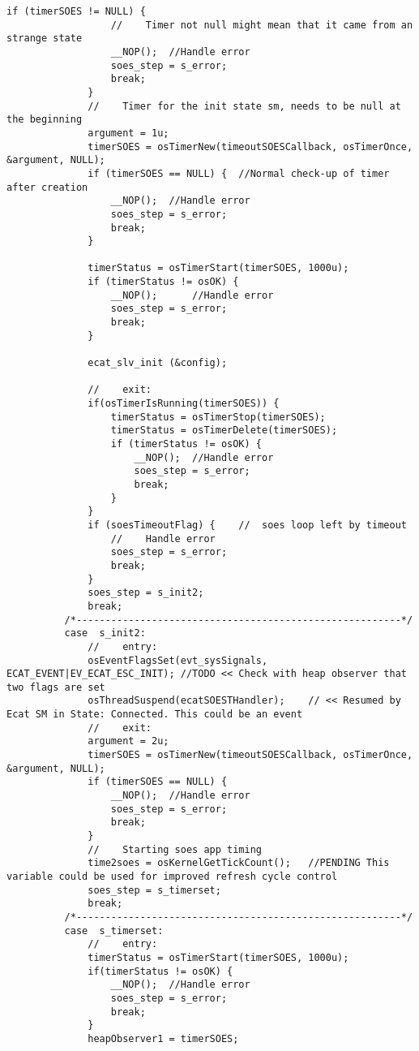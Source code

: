 \begin{lstlisting}[label=lst:soesAPP,caption={Main source code for SOES APP DSM.}]
              if (timerSOES != NULL) {
                  //	Timer not null might mean that it came from an strange state
                  __NOP();	//Handle error
                  soes_step = s_error;
                  break;
              }
              //	Timer for the init state sm, needs to be null at the beginning
              argument = 1u;
              timerSOES = osTimerNew(timeoutSOESCallback, osTimerOnce, &argument, NULL);
              if (timerSOES == NULL) {	//Normal check-up of timer after creation
                  __NOP();	//Handle error
                  soes_step = s_error;
                  break;
              }
   
              timerStatus = osTimerStart(timerSOES, 1000u);
              if (timerStatus != osOK) {
                  __NOP();		//Handle error
                  soes_step = s_error;
                  break;
              }
   
              ecat_slv_init (&config);
   
              //	exit:
              if(osTimerIsRunning(timerSOES)) {
                  timerStatus = osTimerStop(timerSOES);
                  timerStatus = osTimerDelete(timerSOES);
                  if (timerStatus != osOK) {
                      __NOP();	//Handle error
                      soes_step = s_error;
                      break;
                  }
              }
              if (soesTimeoutFlag) {	//	soes loop left by timeout
                  //	Handle error
                  soes_step = s_error;
                  break;
              }
              soes_step = s_init2;
              break;
          /*--------------------------------------------------------*/
          case  s_init2:
              //	entry:
              osEventFlagsSet(evt_sysSignals, ECAT_EVENT|EV_ECAT_ESC_INIT);	//TODO << Check with heap observer that two flags are set
              osThreadSuspend(ecatSOESTHandler);	// << Resumed by Ecat SM in State: Connected. This could be an event
              //	exit:
              argument = 2u;
              timerSOES = osTimerNew(timeoutSOESCallback, osTimerOnce, &argument, NULL);
              if (timerSOES == NULL) {
                  __NOP();	//Handle error
                  soes_step = s_error;
                  break;
              }
              //	Starting soes app timing
              time2soes = osKernelGetTickCount();	//PENDING This variable could be used for improved refresh cycle control
              soes_step = s_timerset;
              break;
          /*--------------------------------------------------------*/
          case  s_timerset:
              //	entry:
              timerStatus = osTimerStart(timerSOES, 1000u);
              if(timerStatus != osOK) {
                  __NOP();	//Handle error
                  soes_step = s_error;
                  break;
              }
              heapObserver1 = timerSOES;
   

\end{lstlisting}
